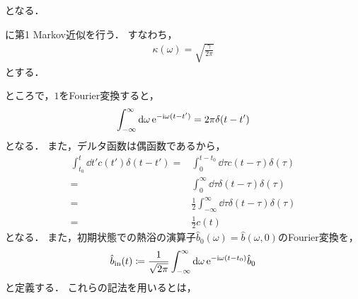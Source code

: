 \documentclass{report}
\begin{document}
      となる．
      \par
      に第1 Markov近似を行う．
      すなわち，
      \begin{align}
        \kappa(\omega) = \sqrt{\frac{\gamma}{2\pi}}
      \end{align}
      とする．
      \par
      ところで，$1$をFourier変換すると，
      \begin{align}
        \int_{-\infty}^{\infty}\dd{\omega}\mathrm{e}^{-\mathrm{i}\omega(t - t')} = 2\pi\delta(t - t')
      \end{align}
      となる．
      また，デルタ函数は偶函数であるから，
      \begin{align}
        \int_{t_0}^{t}\dd{t'}c(t')\delta(t - t') =& \int_{0}^{t - t_0}\dd{\tau}c(t - \tau)\delta(\tau) \\ 
        =& \int_{0}^{\infty}\dd{\tau}\delta(t - \tau)\delta(\tau) \\ 
        =& \frac{1}{2}\int_{-\infty}^{\infty}\dd{\tau}\delta(t - \tau)\delta(\tau) \\ 
        =& \frac{1}{2}c(t)
      \end{align}
      となる．
      また，初期状態での熱浴の演算子$\hat{b}_0(\omega) = \hat{b}(\omega, 0)$のFourier変換を，
      \begin{align}
        \hat{b}_{\mathrm{in}}(t) \coloneqq \frac{1}{\sqrt{2\pi}}\int_{-\infty}^{\infty}\dd{\omega}\mathrm{e}^{-\mathrm{i}\omega(t - t_0)}\hat{b}_0
      \end{align}
      と定義する．
      これらの記法を用いるとは，
\end{document}
